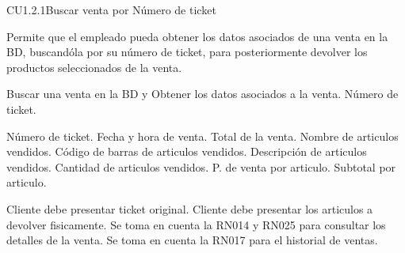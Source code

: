 \begin{UseCase} {CU1.2.1}{Buscar venta por Número de ticket}{
	
	Permite que el empleado pueda obtener los datos asociados de una venta en la BD, buscandóla por su número de ticket, para posteriormente devolver los productos seleccionados de la venta.
}








	
	{
	}
	{
		Buscar una venta en la BD y Obtener los datos asociados a la venta.
	}
	{
		\UCli Número de ticket.
	}
	{
		\UCli Número de ticket.
		\UCli Fecha y hora de venta.
		\UCli Total de la venta.
		\UCli Nombre de articulos vendidos.
		\UCli Código de barras de articulos vendidos.
		\UCli Descripción de articulos vendidos.
		\UCli Cantidad de articulos vendidos.
		\UCli P. de venta por articulo.
		\UCli Subtotal por articulo.
		
	}

	{
		\UCli Cliente debe presentar ticket original.
		\UCli Cliente debe presentar los articulos a devolver fisicamente.
		\UCli Se toma en cuenta la RN014 y RN025 para consultar los detalles de la venta.
		\UCli Se toma en cuenta la RN017 para el historial de ventas. %
	
}
\end{UseCase}
